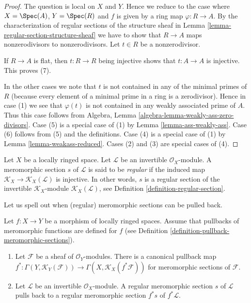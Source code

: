\begin{proof}
The question is local on $X$ and $Y$. Hence we reduce to the case where
$X = \Spec(A)$, $Y = \Spec(R)$ and $f$ is given by a ring map
$\varphi : R \to A$.
By the characterization of regular sections of the structure sheaf
in Lemma \ref{lemma-regular-section-structure-sheaf} we have to
show that $R \to A$ maps nonzerodivisors to nonzerodivisors.
Let $t \in R$ be a nonzerodivisor.

\medskip\noindent
If $R \to A$ is flat, then $t : R \to R$ being injective
shows that $t : A \to A$ is injective. This proves (7).

\medskip\noindent
In the other cases we note that $t$ is not contained in any of
the minimal primes of $R$ (because every element of a minimal
prime in a ring is a zerodivisor).
Hence in case (1) we see that $\varphi(t)$ is not contained
in any weakly associated prime of $A$. Thus this case follows from
Algebra, Lemma \ref{algebra-lemma-weakly-ass-zero-divisors}.
Case (5) is a special case of (1) by Lemma \ref{lemma-ass-weakly-ass}.
Case (6) follows from (5) and the definitions.
Case (4) is a special case of (1) by
Lemma \ref{lemma-weakass-reduced}.
Cases (2) and (3) are special cases of (4).
\end{proof}

\begin{definition}
\label{definition-regular-meromorphic-section}
Let $X$ be a locally ringed space.
Let $\mathcal{L}$ be an invertible $\mathcal{O}_X$-module.
A meromorphic section $s$ of $\mathcal{L}$ is said to be {\it regular}
if the induced map
$\mathcal{K}_X \to \mathcal{K}_X(\mathcal{L})$
is injective. In other words, $s$ is a regular
section of the invertible $\mathcal{K}_X$-module
$\mathcal{K}_X(\mathcal{L})$, see
Definition \ref{definition-regular-section}.
\end{definition}

\noindent
Let us spell out when (regular) meromorphic sections can be pulled back.

\begin{lemma}
\label{lemma-meromorphic-sections-pullback}
Let $f : X \to Y$ be a morphism of locally ringed spaces.
Assume that pullbacks of meromorphic functions are defined
for $f$ (see
Definition \ref{definition-pullback-meromorphic-sections}).
\begin{enumerate}
\item Let $\mathcal{F}$ be a sheaf of $\mathcal{O}_Y$-modules.
There is a canonical pullback map
$f^* : \Gamma(Y, \mathcal{K}_Y(\mathcal{F})) \to
\Gamma(X, \mathcal{K}_X(f^*\mathcal{F}))$
for meromorphic sections of $\mathcal{F}$.
\item Let $\mathcal{L}$ be an invertible $\mathcal{O}_X$-module.
A regular meromorphic section $s$ of $\mathcal{L}$ pulls back
to a regular meromorphic section $f^*s$ of $f^*\mathcal{L}$.
\end{enumerate}
\end{lemma}

